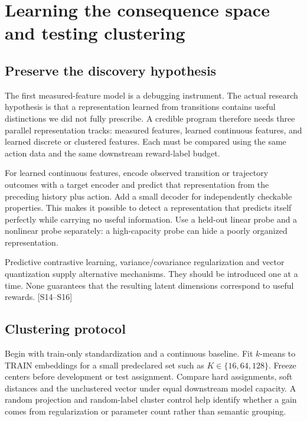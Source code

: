 \documentclass[
  11pt,
  a4paper,
]{article}
\begin{document}
\section{Learning the consequence space and testing
clustering}\label{learning-the-consequence-space-and-testing-clustering}

\subsection{Preserve the discovery
hypothesis}\label{preserve-the-discovery-hypothesis}

The first measured-feature model is a debugging instrument. The actual
research hypothesis is that a representation learned from transitions
contains useful distinctions we did not fully prescribe. A credible
program therefore needs three parallel representation tracks: measured
features, learned continuous features, and learned discrete or clustered
features. Each must be compared using the same action data and the same
downstream reward-label budget.

For learned continuous features, encode observed transition or
trajectory outcomes with a target encoder and predict that
representation from the preceding history plus action. Add a small
decoder for independently checkable properties. This makes it possible
to detect a representation that predicts itself perfectly while carrying
no useful information. Use a held-out linear probe and a nonlinear probe
separately: a high-capacity probe can hide a poorly organized
representation.

Predictive contrastive learning, variance/covariance regularization and
vector quantization supply alternative mechanisms. They should be
introduced one at a time. None guarantees that the resulting latent
dimensions correspond to useful rewards. {[}S14--S16{]}

\subsection{Clustering protocol}\label{clustering-protocol}

Begin with train-only standardization and a continuous baseline. Fit
\(k\)-means to TRAIN embeddings for a small predeclared set such as
\(K\in\{16,64,128\}\). Freeze centers before development or test
assignment. Compare hard assignments, soft distances and the unclustered
vector under equal downstream model capacity. A random projection and
random-label cluster control help identify whether a gain comes from
regularization or parameter count rather than semantic grouping.
\end{document}
